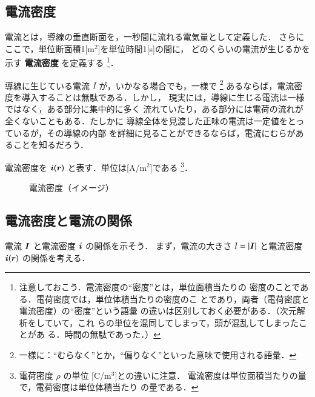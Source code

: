     \subsection{電流密度}
    電流とは，導線の垂直断面を，一秒間に流れる電気量として定義した．
    さらにここで，単位断面積1[m${}^{2}$]を単位時間1[s]の間に，
    どのくらいの電流が生じるかを示す \textbf{電流密度} を定義する
        \footnote{
            注意しておこう．電流密度の“密度”とは，単位面積当たりの
            密度のことである．電荷密度では，単位体積当たりの密度のこ
            とであり，両者（電荷密度と電流密度）の“密度”という語彙
            の違いは区別しておく必要がある．（次元解析をしていて，これ
            らの単位を混同してしまって，頭が混乱してしまったことがあ
            る．時間の無駄であった．）
        }．

        導線に生じている電流 $I$ が，いかなる場合でも，一様で
            \footnote{
                一様に：“むらなく”とか，“偏りなく”といった意味で使用される語彙．
            }
        あるならば，電流密度を導入することは無駄である．しかし，
        現実には，導線に生じる電流は一様ではなく，ある部分に集中的に多く
        流れていたり，ある部分には電荷の流れが全くないこともある．たしかに
        導線全体を見渡した正味の電流は一定値をとっているが，その導線の内部
        を詳細に見ることができるならば，電流にむらがあることを知るだろう．

        電流密度を $\boldsymbol{i}(\boldsymbol{r})$ と表す．単位は[A/m${}^{2}$]である
            \footnote{
                電荷密度 $\rho$ の単位 [C/m${}^{3}$]との違いに注意．
                電流密度は単位面積当たりの量で，電荷密度は単位体積当たり
                の量である．
            }．
        \begin{figure}[hbt]
            \begin{center}
                \caption{電流密度（イメージ）}
                \label{fig:EM_DenryuMitsudo1}
            \end{center}
        \end{figure}

    \subsection{電流密度と電流の関係}
        電流 $\boldsymbol{I}$ と電流密度 $\boldsymbol{i}$ の関係を示そう．
        まず，電流の大きさ $I=|\boldsymbol{I}|$ と電流密度 $\boldsymbol{i}(\boldsymbol{r})$ の関係を考える．

